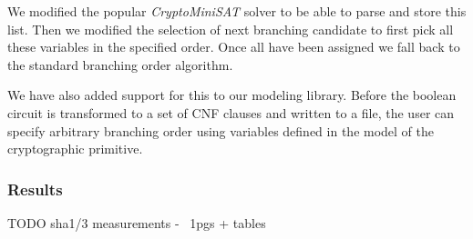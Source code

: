 We modified the popular \emph{CryptoMiniSAT} solver to be able to parse and store this list.
Then we modified the selection of next branching candidate to first pick all these variables in the specified order.
Once all have been assigned we fall back to the standard branching order algorithm.

We have also added support for this to our modeling library.
Before the boolean circuit is transformed to a set of CNF clauses and written to a file, the user can specify arbitrary branching order using variables defined in the model of the cryptographic primitive.

\subsubsection{Results}
TODO sha1/3 measurements - ~1pgs + tables
%
%
%
